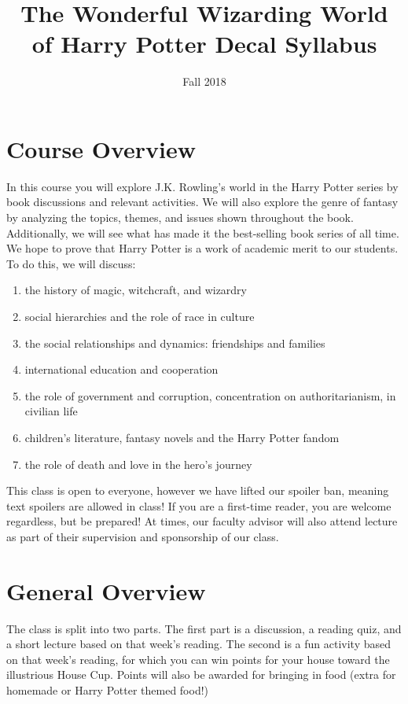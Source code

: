 \documentclass{article}
\title{The Wonderful Wizarding World of Harry Potter Decal Syllabus}
\author{Fall 2018}
\date{ }
\begin{document}
 \maketitle

\section{Course Overview }
In this course you will explore J.K. Rowling’s world in the Harry Potter series by book discussions and relevant activities. We will also explore the genre of fantasy by analyzing the topics, themes, and issues shown throughout the book. Additionally, we will see what has made it the best-selling book series of all time. We hope to prove that Harry Potter is a work of academic merit to our students. To do this, we will discuss:
\begin{enumerate}
\item the history of magic, witchcraft, and wizardry
\item social hierarchies and the role of race in culture 
\item the social relationships and dynamics: friendships and families
\item international education and cooperation 
\item the role of government and corruption, concentration on authoritarianism, in civilian life
\item children’s literature, fantasy novels and the Harry Potter fandom
\item the role of death and love in the hero’s journey
\end{enumerate}

This class is open to everyone, however we have lifted our spoiler ban, meaning text spoilers are allowed in class! If you are a first-time reader, you are welcome regardless, but be prepared! At times, our faculty advisor will also attend lecture as part of their supervision and sponsorship of our class.

\maketitle

\section{General Overview}
 The class is split into two parts. The first part is a discussion, a reading quiz, and a short lecture based on that week's reading. The second is a fun activity based on that week's reading, for which you can win points for your house toward the illustrious House Cup. Points will also be awarded for bringing in food (extra for homemade or Harry Potter themed food!)
 
\end{document}
